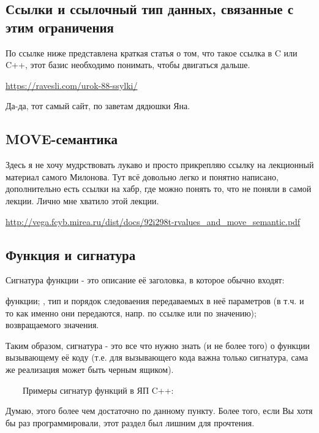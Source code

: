 \subsection{Ссылки и ссылочный тип данных, связанные с этим ограничения}

По ссылке ниже представлена краткая статья о том, что такое ссылка в C или C++, этот базис необходимо понимать, чтобы двигаться дальше.

\url{https://ravesli.com/urok-88-ssylki/}

Да-да, тот самый сайт, по заветам дядюшки Яна.


\subsection{MOVE-семантика}
Здесь я не хочу мудрствовать лукаво и просто прикрепляю ссылку на лекционный материал самого Милонова. Тут всё довольно легко и понятно написано, дополнительно есть ссылки на хабр, где можно понять то, что не поняли в самой лекции. Лично мне хватило этой лекции.

\url{http://vega.fcyb.mirea.ru/dist/docs/92i298t-rvalues_and_move_semantic.pdf}

\subsection{Функция и сигнатура}

\begin{definition}
    Сигнатура функции - это описание её заголовка, в которое обычно входят:
    \begin{enumerate}
         функции;
        , тип и порядок следоваения передаваемых в неё параметров (в т.ч. и то как именно они передаются, напр. по ссылке или по значению);
         возвращаемого значения.
    \end{enumerate}
    
Таким образом, сигнатура - это все что нужно знать (и не более того) о функции вызывающему её коду (т.е. для вызывающего кода важна только сигнатура, сама же реализация может быть черным ящиком).
\end{definition}
$\qquad$Примеры сигнатур функций в ЯП C++:

\lstset{language=C++, keepspaces = true, extendedchars=\false}

\begin{notice}
    Думаю, этого более чем достаточно по данному пункту. Более того, если Вы хотя бы раз программировали, этот раздел был лишним для прочтения.
\end{notice}
\newpage
